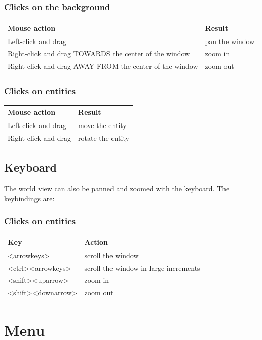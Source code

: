 \documentclass[11pt,twoside]{report}
\begin{document}
\subsubsection*{Clicks on the background}

\begin{tabular}{|l|l|}
\hline Mouse action & Result\\\hline
Left-click and drag & pan the window\\
Right-click and drag TOWARDS the center of the window & zoom in\\
Right-click and drag AWAY FROM the center of the window & zoom out\\ 
\hline
\end{tabular}

\subsubsection*{Clicks on entities}
\begin{tabular}{|l|l|}
\hline Mouse action & Result\\\hline
Left-click and drag & move the entity\\
Right-click and drag & rotate the entity\\
\hline
\end{tabular}

\subsection{Keyboard}
The world view can also be panned and zoomed with the keyboard. The
keybindings are:

\subsubsection*{Clicks on entities}
\begin{tabular}{|l|l|}
\hline Key & Action\\ \hline
<arrowkeys>        & scroll the window \\
<ctrl><arrowkeys>  & scroll the window in large increments \\
<shift><uparrow>   & zoom in \\
<shift><downarrow> & zoom out \\
\hline 
\end{tabular}

\section{Menu}
\end{document}
